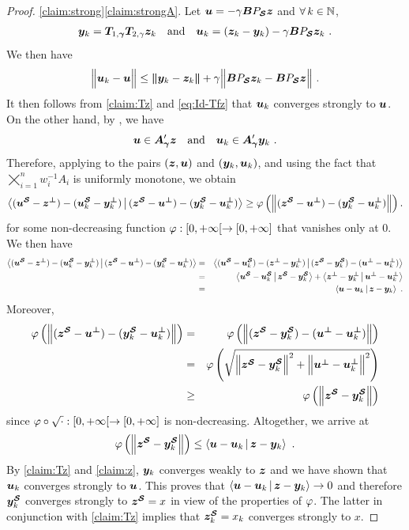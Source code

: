 \begin{proof}
\ref{claim:strong}\ref{claim:strongA}.
Let $\bu = -\ga\bBJ\bz$ and $\foralls k \in \NN$,
\begin{eqnarray*}
\by_k = \Tb \Tf \bz_k \quad \text{and} \quad \bu_k = (\bz_k - \by_k) - \ga \bBJ\bz_k ~.
\end{eqnarray*}
We then have
\[
\normb{\bu_k - \bu} \leq \bnorm{\by_k-\bz_k} + \ga \normb{\bBJ \bz_k - \bBJ \bz} ~.
\]
It then follows from \ref{claim:Tz} and \eqref{eq:Id-Tfz} that $\bu_k$ converges strongly to $\bu$. On the other hand, by , we have
\[
\bu \in \Apga\bz \quad \text{and} \quad \bu_k \in \Apga\by_k ~.
\]
Therefore, applying  to the pairs $(\bz,\bu)$ and $(\by_k,\bu_k)$, and using the fact that $\bigtimes_{i=1}^n w_i^{-1} A_i$ is uniformly monotone, we obtain
\begin{eqnarray*}
\dprod{(\pSs{\bu}-\pSp{\bz})-(\pSs{\bu}_k-\pSp{\by}_k)}{(\pSs{\bz}-\pSp{\bu})-(\pSs{\by}_k-\pSp{\bu}_k)} \geq \phy\pa{\normb{(\pSs{\bz}-\pSp{\bu})-(\pSs{\by}_k-\pSp{\bu}_k)}}.
\end{eqnarray*}
for some non-decreasing function $\phy: [0,\pinfty[ \to [0,\pinfty]$ that vanishes only at $0$. We then have
\begin{eqnarray*}
\dprod{(\pSs{\bu}-\pSp{\bz})-(\pSs{\bu}_k-\pSp{\by}_k)}{(\pSs{\bz}-\pSp{\bu})-(\pSs{\by}_k-\pSp{\bu}_k)} &=&
\dprod{(\pSs{\bu}-\pSs{\bu}_k)-(\pSp{\bz}-\pSp{\by}_k)}{(\pSs{\bz}-\pSs{\by}_k)-(\pSp{\bu}-\pSp{\bu}_k)} \\
&=& \dprod{\pSs{\bu}-\pSs{\bu}_k}{\pSs{\bz}-\pSs{\by}_k}+\dprod{\pSp{\bz}-\pSp{\by}_k}{\pSp{\bu}-\pSp{\bu}_k} \\
&=& \dprod{\bu-\bu_k}{\bz-\by_k} ~.
\end{eqnarray*}
Moreover,
\begin{eqnarray*}
\phy\pa{\normb{(\pSs{\bz}-\pSp{\bu})-(\pSs{\by}_k-\pSp{\bu}_k)}} &=& \phy\pa{\normb{(\pSs{\bz}-\pSs{\by}_k)-(\pSp{\bu}-\pSp{\bu}_k)}} \\
&=& \phy\pa{\sqrt{\normb{\pSs{\bz}-\pSs{\by}_k}^2+\normb{\pSp{\bu}-\pSp{\bu}_k}^2}}\\
&\geq& \phy\pa{\normb{\pSs{\bz}-\pSs{\by}_k}}
\end{eqnarray*}
since $\phy \circ \sqrt{\cdot}: [0,\pinfty[ \to [0,\pinfty]$ is non-decreasing. Altogether, we arrive at
\[
\phy\pa{\normb{\pSs{\bz}-\pSs{\by}_k}} \leq \dprod{\bu-\bu_k}{\bz-\by_k} ~.
\]
By \ref{claim:Tz} and \ref{claim:z}, $\by_k$ converges weakly to $\bz$ and we have shown that $\bu_k$ converges strongly to $\bu$. This proves that $\dprod{\bu-\bu_k}{\bz-\by_k} \to 0$ and therefore $\pSs{\by}_k$ converges strongly to $\pSs{\bz}=x$ in view of the properties of $\phy$. The latter in conjunction with \ref{claim:Tz} implies that $\pSs{\bz}_k=x_k$ converges strongly to $x$.


\end{proof}
